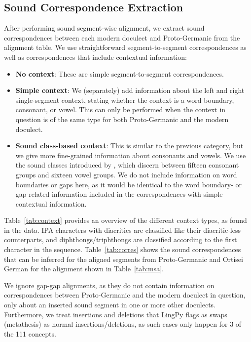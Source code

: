 \documentclass[a4paper]{article}
\begin{document}
\subsection{Sound Correspondence Extraction}
\label{subsec:corres}

After performing sound segment-wise alignment,
we extract sound correspondences between each
modern doculect and Proto-Germanic from the alignment table.
We use straightforward segment-to-segment correspondences
as well as correspondences that include contextual information:

\begin{itemize}
\item
\textbf{No context}:
These are simple segment-to-segment correspondences.

\item
\textbf{Simple context}:
We (separately) add information about the
left and right single-segment context,
stating whether the context is a
word boundary, consonant, or vowel. 
This can only be performed when the context in question is of
the same type for both Proto-Germanic and the modern doculect.

\item
\textbf{Sound class-based context}:
This is similar to the previous category,
but we give more fine-grained information about consonants and vowels.
We use the sound classes introduced by \citet{list2012sca},
which discern between fifteen consonant groups and sixteen vowel groups.
We do not include information on word boundaries or gaps here,
as it would be identical to the word boundary- or gap-related information
included in the correspondences with simple contextual information.

\end{itemize}

Table~\ref{tab:context} provides an overview
of the different context types, as found in the data.
IPA characters with diacritics are classified
like their diacritic-less counterparts,
and diphthongs/triphthongs are classified
according to the first character in the sequence.
Table~\ref{tab:corres} shows the sound correspondences
that can be inferred for the aligned segments
from Proto-Germanic and Ortisei German for the alignment
shown in Table~\ref{tab:msa}.

We ignore gap-gap alignments,
as they do not contain information on correspondences
between Proto-Germanic and the modern doculect in question,
only about an inserted sound segment in one or more other doculects.
Furthermore, we treat insertions and deletions
that LingPy flags as swaps (metathesis) as normal insertions/deletions,
as such cases only happen for 3 of the 111 concepts.
\end{document}
